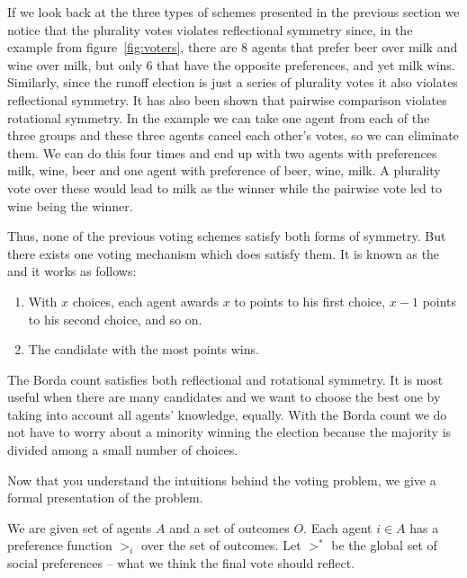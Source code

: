 If we look back at the three types of schemes presented in the
previous section we notice that the plurality votes violates
reflectional symmetry since, in the example from
figure~\ref{fig:voters}, there are 8 agents that prefer beer over milk
and wine over milk, but only 6 that have the opposite preferences, and
yet milk wins. Similarly, since the runoff election is just a series
of plurality votes it also violates reflectional symmetry. It has also
been shown that pairwise comparison violates rotational symmetry. In
the example we can take one agent from each of the three groups and
these three agents cancel each other's votes, so we can eliminate
them. We can do this four times and end up with two agents with
preferences milk, wine, beer and one agent with preference of beer,
wine, milk. A plurality vote over these would lead to milk as the
winner while the pairwise vote led to wine being the winner.

Thus, none of the
previous voting schemes satisfy both forms of symmetry. But there
exists one voting mechanism which does satisfy them. It is known as
the  and it works as follows:

\begin{enumerate}
\item With $x$ choices, each agent awards $x$ to points to his first
  choice, $x-1$ points to his second choice, and so on.
  
\item The candidate with the most points wins.
  
\end{enumerate}

The Borda count satisfies both reflectional and rotational symmetry.
It is most useful when there are many candidates and we want to choose
the best one by taking into account all agents' knowledge,
equally. With the Borda count we do not have to worry about a minority
winning the election because the majority is divided among a small
number of choices.

\medskip

Now that you understand the intuitions behind the voting problem, we
give a formal presentation of the problem.

\begin{definition}
  We are given set of agents $A$ and a set of outcomes $O$. Each agent
  $i \in A$ has a preference function $>_i$ over the set of outcomes. Let
  $>^*$ be the global set of social preferences -- what we think the
  final vote should reflect.
\end{definition}

